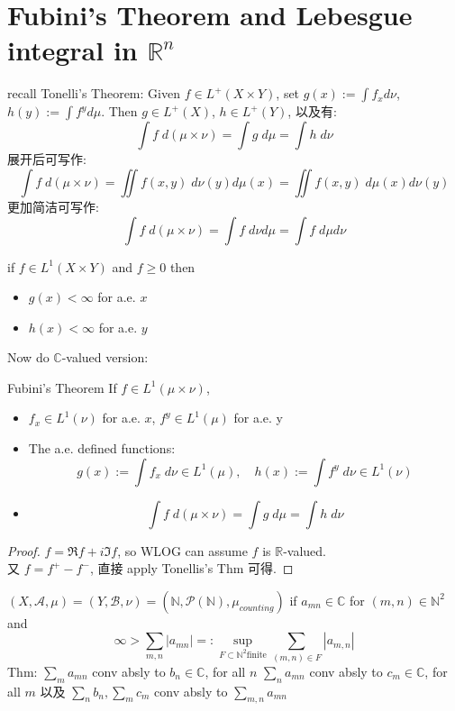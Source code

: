 \documentclass[lang=cn,11pt]{elegantbook}
\begin{document}
\chapter{Fubini's Theorem and Lebesgue integral in $\mathbb{R}^n$}
recall Tonelli's Theorem: Given $f \in L^+(X \times Y)$, set $g(x) := \int f_x d\nu $, $h(y) := \int f^y d \mu$. 
Then $g \in L^+(X)$, $h \in L^+(Y)$, 以及有: \[
\int f \; d(\mu \times \nu) = \int g \; d \mu = \int h \; d\nu
\]
展开后可写作: \[
\int f \; d(\mu \times \nu)  = \iint  f(x,y) \; d\nu(y) d\mu(x) = \iint f(x,y) \; d\mu(x) d\nu(y)
\]更加简洁可写作: \[
\int f \; d(\mu \times \nu) = \int f \; d\nu d\mu  = \int f \; d\mu d\nu
\]

\begin{corollary}
    if $f \in L^1(X\times Y)$ and $f \geq 0$ then 
    \begin{itemize}
        \item     $g(x) < \infty$ for a.e. $x$
        \item $h(x) < \infty$ for a.e. $y$
    \end{itemize}
\end{corollary}


Now do $\mathbb{C}$-valued version:





\begin{theorem}{Fubini's Theorem}
    If $f \in L^1(\mu \times \nu)$, 
    \begin{itemize}
        \item $f_x \in L^1(\nu)$ for a.e. $x$, $f^y \in L^1(\mu)$ for a.e. y
        \item The a.e. defined functions: \[ g(x) := \int f_x \;d\nu \in L^1(\mu),\quad h(x) := \int f^y \;d\nu \in L^1(\nu) \]
        \item \[ \int f \; d(\mu \times \nu)  = \int g \; d\mu = \int h \; d\nu \]
    \end{itemize}
\end{theorem}
\begin{proof}
\(f = \Re f + i \Im f \), so WLOG can assume $f$ is $\mathbb{R}$-valued.\\
又 $f = f^+ - f^-$, 直接 apply Tonellis's Thm 可得.
\end{proof}



\begin{example}
    $(X, \mathcal{A}, \mu) = (Y , \mathcal{B}, \nu) = (\mathbb{N}, \mathcal{P}(\mathbb{N}), \mu_{counting})$
if $a_{mn} \in \mathbb{C}$ for $(m,n) \in \mathbb{N}^2$ and \[
\infty > \sum_{m,n} |a_{mn}| =: \sup_{F \subset \mathbb{N}^2  \text{finite}} \sum_{(m,n) \in F}  |a_{m,n}|
\]
Thm: $\sum_m a_{mn}$ conv absly to $b_n \in \mathbb{C}$, for all $n$
$\sum_n a_{mn}$ conv absly to $c_m \in \mathbb{C}$, for all $m$
以及 $\sum_n b_n, \sum_m c_m$ conv absly to $\sum_{m,n} a_{mn}$
\end{example}
\end{document}
